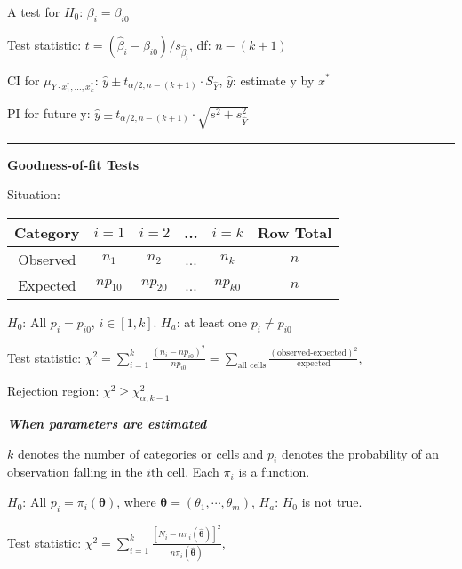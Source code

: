 \documentclass{article}
\newcommand{\sectionline}{\color{black}\rule[2pt]{0.45\textwidth}{0.05em}\color{black}}
\newcommand{\bigtitle}[1]{
	\noindent
	\textbf{#1}
}
\newcommand{\smalltitle}[1]{
	\noindent
	\textbf{\textit{#1}}
}
\begin{document}
	A test for $H_0$: $\beta_i = \beta_{i0}$
	
	
	Test statistic: $t = \left( \hat { \beta } _ { i } - \beta _ { i 0 } \right) / s _ { \hat { \beta }_i }$, df: $n-(k+1)$
	
	
	CI for $\mu _ { Y \cdot x _ { 1 } ^ { * } , \ldots , x _ { k } ^ { * } }$: $\hat { y } \pm t _ { \alpha / 2 , n - ( k + 1 ) } \cdot S _ { \hat { Y } }$, $\hat{ y }$: estimate y by $x^*$
	
	PI for future y: $\hat { y } \pm t _ { \alpha / 2 , n - ( k + 1 ) } \cdot \sqrt { s ^ { 2 } + s _ { \hat { Y } } ^ { 2 } }$
	
	\sectionline
	
	\bigtitle{Goodness-of-fit Tests}
	
	Situation:
	
	
	\begin{table}[htb]
		\vspace{-0.8em}
		\centering
		\begin{tabular}{cccccc}
			Category & $i=1$     & $i=2$     & ... & $i=k$     & Row Total \\\hline
			Observed & $n_1$     & $n_2$     & ... & $n_k$     & $n$       \\
			Expected & $np_{10}$ & $np_{20}$ & ... & $np_{k0}$ & $n$      
		\end{tabular}
	\vspace{-1em}
	\end{table}
	
	
	
	$H_0$: All $p_i = p_{i0}$, $i\in [1,k]$. $H_a$: at least one $p_i \neq p_{i0}$
	
	
	Test statistic: $\chi^2 = \sum \limits_ { i = 1 } ^ { k } \frac { \left( n _ { i } - n p _ { i 0 } \right) ^ { 2 } } { n p _ { i 0 } } = \sum \limits_{\text{all cells}} \frac{(\text{observed-expected})^2}{\text{expected}}$,
	
	
	Rejection region: $\chi ^ { 2 } \geq \chi _ { \alpha , k - 1 } ^ { 2 }$
	
	\smalltitle{When parameters are estimated}
	
	$k$ denotes the number of categories or cells and $p_i$ denotes the probability of an observation falling in the $i$th cell. Each $\pi_{ i }$ is a function.
	
	\noindent
	$H_0$: All $p_i = \pi_i(\boldsymbol{\theta})$, where $\boldsymbol{\theta} = (\theta_1,\cdots,\theta_m)$,
	$H_a$: $H_0$ is not true.
	
	Test statistic: $\chi^2 = \sum _ { i = 1 } ^ { k } \frac { \left[ N _ { i } - n \pi _ { i } ( \hat { \boldsymbol { \theta } } ) \right] ^ { 2 } } { n \pi _ { i } ( \hat { \boldsymbol { \theta } } ) }$,
	
\end{document}
